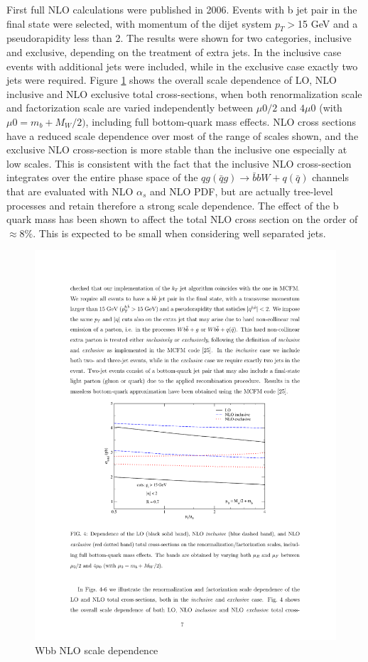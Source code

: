 \par First full NLO calculations were published in 2006\cite{FebresCordero:2006sj}. 
Events with b jet pair in the final state were selected, with momentum of the dijet system $p_T>$15 GeV  and a pseudorapidity less than 2. The results were shown for two categories, inclusive and exclusive, depending on the treatment of extra jets. In the inclusive case events with additional jets were included, while in the exclusive case exactly two jets were required.
Figure \ref{fig:2006_scale} shows the overall scale dependence of LO, NLO inclusive and NLO exclusive total cross-sections, when both renormalization scale and factorization scale are varied independently between $\mu 0/2$ and $4\mu 0$ (with $\mu 0 = m_b + M_W /2)$, including full bottom-quark mass effects. NLO cross sections have a reduced scale dependence over most of the range of scales shown, and the exclusive NLO cross-section is more stable than the inclusive one especially at low scales.
This is consistent with the fact that the inclusive NLO cross-section integrates over the
entire phase space of the $qg(\bar{q}g) \rightarrow \bar{b}bW + q(\bar{q})$ channels that are evaluated with NLO $\alpha_s$ and NLO PDF, but are actually tree-level processes and retain therefore a strong scale
dependence. The effect of the b quark mass has been shown to affect the total NLO cross section on the order of $\approx 8\%$. This is expected to be small when considering well separated jets.
\begin{figure}[htbp]
	\centering
		\includegraphics{Figures/2006_scale.pdf}
	\caption[Wbb NLO scale dependence]{Wbb NLO scale dependence\cite{FebresCordero:2006sj}}
	\label{fig:2006_scale}
\end{figure}
